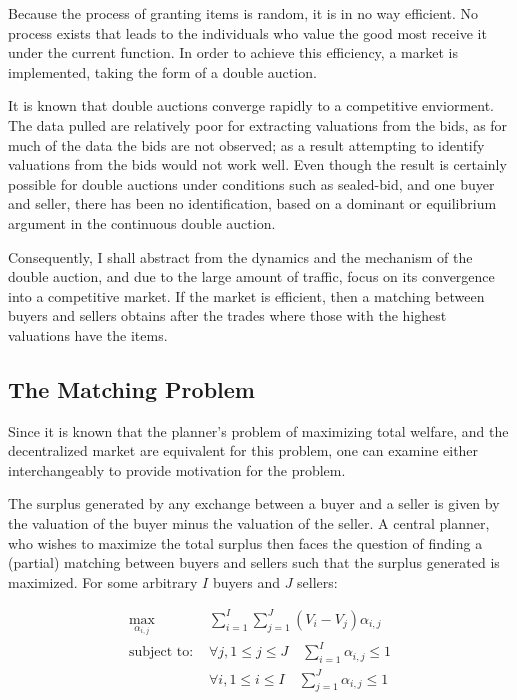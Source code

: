 \documentclass[12pt, letterpaper]{paper}
\begin{document}
Because the process of granting items is random, it is in no way
efficient. No process exists that leads to the individuals who
value the good most receive it under the current function. In order to
achieve this efficiency, a market is implemented, taking the form
of a double auction.

It is known that double auctions  converge rapidly to a competitive
enviorment. The data pulled are relatively poor for extracting
valuations from the bids, as for much of the data the bids are not
observed; as a result attempting to identify valuations from the bids
would not work well. Even though the result is certainly possible for
double auctions under conditions such as sealed-bid, and one buyer and
seller, there has been no identification, based on a dominant or
equilibrium argument in the continuous double auction. 

Consequently, I shall abstract from the dynamics and the
mechanism of the double auction, and due to the large amount of
traffic, focus on its convergence into a competitive market. If the
market is efficient, then a matching between buyers and
sellers obtains after the trades where those with the highest
valuations have the items.

\subsection{The Matching Problem}
\label{sec-2-1}
Since it is known that the planner's problem of maximizing total
welfare, and the decentralized market are equivalent for this problem,
one can examine either interchangeably to provide motivation for the
problem.

The surplus generated by any exchange between a buyer and a seller is
given by the valuation of the buyer minus the valuation of the
seller. A central planner, who wishes to maximize the total surplus
then faces the question of finding a (partial) matching between buyers
and sellers such that the surplus generated is maximized. For some
arbitrary $I$ buyers and $J$ sellers:

\begin{align*}
\max_{\alpha_{i,j}} & \sum_{i=1}^I \sum_{j=1}^J \left ( V_i - V_j \right ) \alpha_{i,j }\\
\text{subject to: } & \forall j, 1 \leq j \le J \quad \sum_{i=1}^I \alpha_{i,j} \leq 1 \\
& \forall i, 1 \leq i \leq I \quad \sum_{j=1}^J \alpha_{i,j} \le 1 \\
\end{align*}
\end{document}
